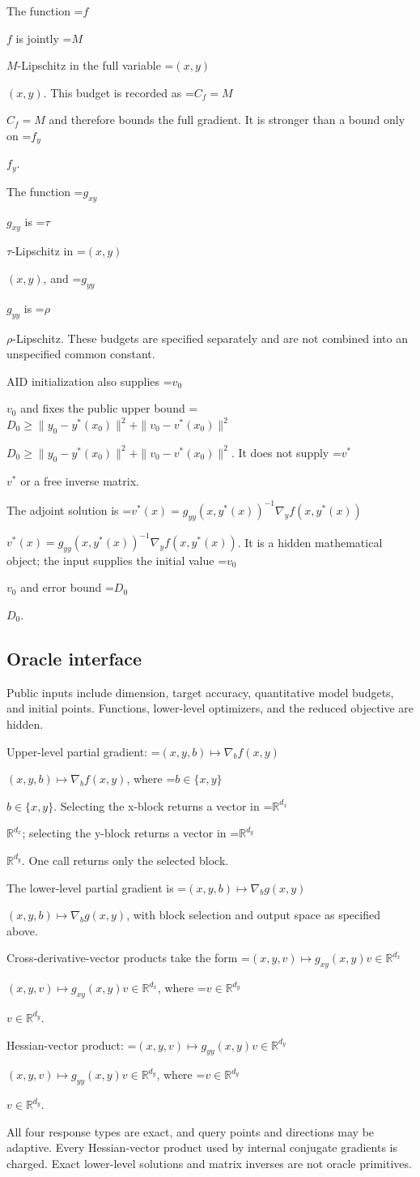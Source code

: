 \documentclass[10pt,a4paper]{article}
\newcommand{\AtlasMath}[1]{\par\begingroup\centering\setbox0=\hbox{$\displaystyle #1$}\ifdim\wd0>1.4\linewidth\typeout{ATLAS WIDE FORMULA: \the\wd0}\fi\ifdim\wd0>\linewidth\resizebox{\linewidth}{!}{\box0}\else\box0\fi\par\endgroup}
\newcommand{\AtlasInlineMath}[1]{\begingroup\setbox0=\hbox{$#1$}\ifdim\wd0>.4\linewidth\endgroup\AtlasMath{#1}\else\endgroup$#1$\fi}
\begin{document}
The function \AtlasInlineMath{f} is jointly \AtlasInlineMath{M}-Lipschitz in the full variable \AtlasInlineMath{(x,y)}. This budget is recorded as \AtlasInlineMath{C_f=M} and therefore bounds the full gradient. It is stronger than a bound only on \AtlasInlineMath{f_y}.

The function \AtlasInlineMath{g_{xy}} is \AtlasInlineMath{\tau}-Lipschitz in \AtlasInlineMath{(x,y)}, and \AtlasInlineMath{g_{yy}} is \AtlasInlineMath{\rho}-Lipschitz. These budgets are specified separately and are not combined into an unspecified common constant.

AID initialization also supplies \AtlasInlineMath{v_0} and fixes the public upper bound \AtlasInlineMath{D_0\ge\|y_0-y^*(x_0)\|^2+\|v_0-v^*(x_0)\|^2}. It does not supply \AtlasInlineMath{v^*} or a free inverse matrix.

The adjoint solution is \AtlasInlineMath{v^*(x)=g_{yy}(x,y^*(x))^{-1}\nabla_yf(x,y^*(x))}. It is a hidden mathematical object; the input supplies the initial value \AtlasInlineMath{v_0} and error bound \AtlasInlineMath{D_0}.

\subsection{Oracle interface}
Public inputs include dimension, target accuracy, quantitative model budgets, and initial points. Functions, lower-level optimizers, and the reduced objective are hidden.

Upper-level partial gradient: \AtlasInlineMath{(x,y,b)\mapsto\nabla_b f(x,y)}, where \AtlasInlineMath{b\in\{x,y\}}. Selecting the x-block returns a vector in \AtlasInlineMath{\mathbb R^{d_x}}; selecting the y-block returns a vector in \AtlasInlineMath{\mathbb R^{d_y}}. One call returns only the selected block.

The lower-level partial gradient is \AtlasInlineMath{(x,y,b)\mapsto\nabla_b g(x,y)}, with block selection and output space as specified above.

Cross-derivative-vector products take the form \AtlasInlineMath{(x,y,v)\mapsto g_{xy}(x,y)v\in\mathbb R^{d_x}}, where \AtlasInlineMath{v\in\mathbb R^{d_y}}.

Hessian-vector product: \AtlasInlineMath{(x,y,v)\mapsto g_{yy}(x,y)v\in\mathbb R^{d_y}}, where \AtlasInlineMath{v\in\mathbb R^{d_y}}.

All four response types are exact, and query points and directions may be adaptive. Every Hessian-vector product used by internal conjugate gradients is charged. Exact lower-level solutions and matrix inverses are not oracle primitives.
\end{document}
